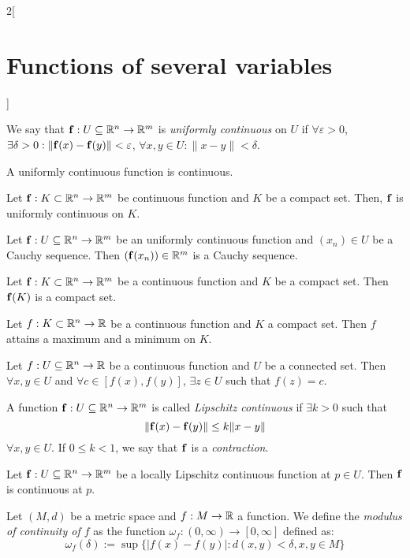 \documentclass[../../../main.tex]{subfiles}
\begin{document}
\begin{multicols}{2}[\section{Functions of several variables}]
    \begin{definition}
        We say that $\boldsymbol{\mathrm{f}}:U\subseteq\mathbb{R}^n\rightarrow\mathbb{R}^m$ is \textit{uniformly continuous} on $U$ if $\forall\varepsilon>0$, $\exists\delta>0:\|\boldsymbol{\mathrm{f}}(x)-\boldsymbol{\mathrm{f}}(y)\|<\varepsilon$, $\forall x,y\in U:\|x-y\|<\delta$.
    \end{definition}
    \begin{corollary}
        A uniformly continuous function is continuous.
    \end{corollary}
    \begin{theorem}
        Let $\boldsymbol{\mathrm{f}}:K\subset\mathbb{R}^n\rightarrow\mathbb{R}^m$ be continuous function and $K$ be a compact set. Then, $\boldsymbol{\mathrm{f}}$ is uniformly continuous on $K$.
    \end{theorem}
    \begin{theorem}
        Let $\boldsymbol{\mathrm{f}}:U\subseteq\mathbb{R}^n\rightarrow\mathbb{R}^m$ be an uniformly continuous function and $(x_n)\in U$ be a Cauchy sequence. Then $(\boldsymbol{\mathrm{f}}(x_n))\in\mathbb{R}^m$ is a Cauchy sequence.
    \end{theorem}
    \begin{theorem}
        Let $\boldsymbol{\mathrm{f}}:K\subset\mathbb{R}^n\rightarrow\mathbb{R}^m$ be a continuous function and $K$ be a compact set. Then $\boldsymbol{\mathrm{f}}(K)$ is a compact set.
    \end{theorem}
    \begin{theorem}
        Let $f:K\subset\mathbb{R}^n\rightarrow\mathbb{R} $ be a continuous function and $K$ a compact set. Then $f$ attains a maximum and a minimum on $K$.
    \end{theorem}
    \begin{theorem}
        Let $f:U\subseteq\mathbb{R}^n\rightarrow\mathbb{R} $ be a continuous function and $U$ be a connected set. Then $\forall x,y\in U$ and $\forall c\in[f(x),f(y)]$, $\exists z\in U$ such that $f(z)=c$.
    \end{theorem}
    \begin{definition}
        A function $\boldsymbol{\mathrm{f}}:U\subseteq\mathbb{R}^n\rightarrow\mathbb{R}^m$ is called \textit{Lipschitz continuous} if $\exists k>0$ such that $$\|\boldsymbol{\mathrm{f}}(x)-\boldsymbol{\mathrm{f}}(y)\|\leq k\|x-y\|$$ $\forall x,y\in U$. If $0\leq k<1$, we say that $\boldsymbol{\mathrm{f}}$ is a \textit{contraction}.
        \label{FOSV_contr}
    \end{definition}
    \begin{prop}
        Let $\boldsymbol{\mathrm{f}}:U\subseteq\mathbb{R}^n\rightarrow\mathbb{R}^m$ be a locally Lipschitz continuous function at $p\in U$. Then $\boldsymbol{\mathrm{f}}$ is continuous at $p$.
    \end{prop}
    \begin{definition}
        Let $(M,d)$ be a metric space and $f:M\rightarrow\mathbb{R} $ a function. We define the \textit{modulus of continuity of $f$} as the function $\omega_f:(0,\infty)\rightarrow[0,\infty]$ defined as: $$\omega_f(\delta):=\sup\{|f(x)-f(y)|:d(x,y)<\delta, x,y\in M\}$$
    \end{definition}

\end{multicols}
\end{document}
